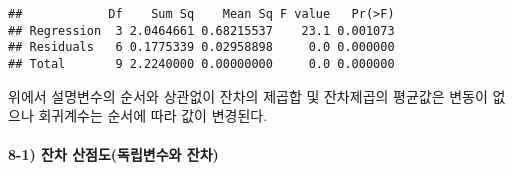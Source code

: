 \documentclass[
]{article}
\begin{document}
\begin{verbatim}
##            Df    Sum Sq    Mean Sq F value   Pr(>F)
## Regression  3 2.0464661 0.68215537    23.1 0.001073
## Residuals   6 0.1775339 0.02958898     0.0 0.000000
## Total       9 2.2240000 0.00000000     0.0 0.000000
\end{verbatim}

위에서 설명변수의 순서와 상관없이 잔차의 제곱합 및 잔차제곱의 평균값은
변동이 없으나 회귀계수는 순서에 따라 값이 변경된다.

\hypertarget{uxc794uxcc28-uxc0b0uxc810uxb3c4uxb3c5uxb9bduxbcc0uxc218uxc640-uxc794uxcc28}{%
\paragraph{8-1) 잔차 산점도(독립변수와
잔차)}\label{uxc794uxcc28-uxc0b0uxc810uxb3c4uxb3c5uxb9bduxbcc0uxc218uxc640-uxc794uxcc28}}
\end{document}
